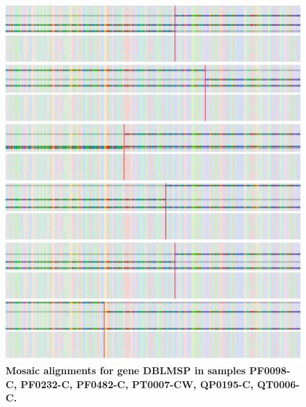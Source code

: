 \documentclass[12pt]{article}
\begin{document}
\begin{figure}
    \centering
    \centerline{\includegraphics[width=1.2\textwidth]{DBLMSP_PF0098-C_PF0232-C_PF0482-C_PT0007-CW_QP0195-C_QT0006-C.png}}
    \caption[Mosaic alignments (3)]{
        \textbf{Mosaic alignments for gene DBLMSP in samples PF0098-C,
        PF0232-C, PF0482-C, PT0007-CW, QP0195-C, QT0006-C.}
        }
    \label{pa:fig:mosaic_app3}
\end{figure}
\end{document}
